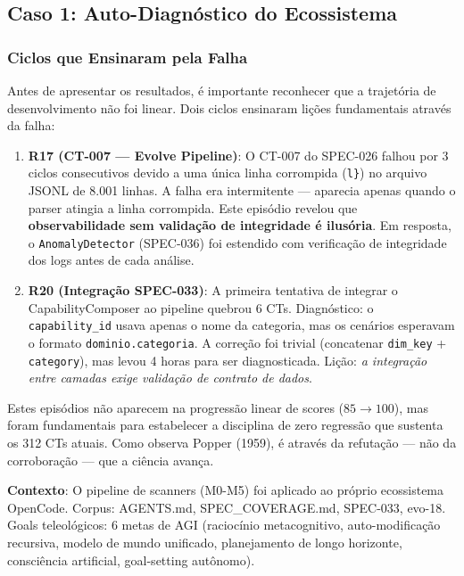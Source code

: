 \subsection{Caso 1: Auto-Diagnóstico do Ecossistema}

\subsubsection{Ciclos que Ensinaram pela Falha}

Antes de apresentar os resultados, é importante reconhecer que a trajetória de desenvolvimento não foi linear. Dois ciclos ensinaram lições fundamentais através da falha:

\begin{enumerate}
    \item \textbf{R17 (CT-007 — Evolve Pipeline)}: O CT-007 do SPEC-026 falhou por 3 ciclos consecutivos devido a uma única linha corrompida (\texttt{l\}}) no arquivo JSONL de 8.001 linhas. A falha era intermitente — aparecia apenas quando o parser atingia a linha corrompida. Este episódio revelou que \textbf{observabilidade sem validação de integridade é ilusória}. Em resposta, o \texttt{AnomalyDetector} (SPEC-036) foi estendido com verificação de integridade dos logs antes de cada análise.
    
    \item \textbf{R20 (Integração SPEC-033)}: A primeira tentativa de integrar o CapabilityComposer ao pipeline quebrou 6 CTs. Diagnóstico: o \texttt{capability\_id} usava apenas o nome da categoria, mas os cenários esperavam o formato \texttt{dominio.categoria}. A correção foi trivial (concatenar \texttt{dim\_key} + \texttt{category}), mas levou 4 horas para ser diagnosticada. Lição: \textit{a integração entre camadas exige validação de contrato de dados}.
\end{enumerate}

Estes episódios não aparecem na progressão linear de scores ($85 \rightarrow 100$), mas foram fundamentais para estabelecer a disciplina de zero regressão que sustenta os 312 CTs atuais. Como observa Popper (1959), é através da refutação — não da corroboração — que a ciência avança.

\textbf{Contexto}: O pipeline de scanners (M0-M5) foi aplicado ao próprio ecossistema OpenCode. Corpus: AGENTS.md, SPEC\_COVERAGE.md, SPEC-033, evo-18. Goals teleológicos: 6 metas de AGI (raciocínio metacognitivo, auto-modificação recursiva, modelo de mundo unificado, planejamento de longo horizonte, consciência artificial, goal-setting autônomo).

